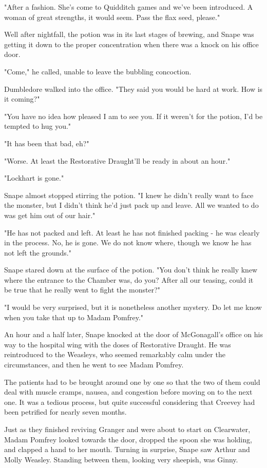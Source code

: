 \documentclass[a4paper,11pt]{article}
\begin{document}
"After a fashion. She's come to Quidditch games and we've been introduced. A woman of great strengths, it would seem. Pass the flax seed, please."

Well after nightfall, the potion was in its last stages of brewing, and Snape was getting it down to the proper concentration when there was a knock on his office door.

"Come," he called, unable to leave the bubbling concoction.

Dumbledore walked into the office. "They said you would be hard at work. How is it coming?"

"You have no idea how pleased I am to see you. If it weren't for the potion, I'd be tempted to hug you."

"It has been that bad, eh?"

"Worse. At least the Restorative Draught'll be ready in about an hour."

"Lockhart is gone."

Snape almost stopped stirring the potion. "I knew he didn't really want to face the monster, but I didn't think he'd just pack up and leave. All we wanted to do was get him out of our hair."

"He has not packed and left. At least he has not finished packing - he was clearly in the process. No, he is gone. We do not know where, though we know he has not left the grounds."

Snape stared down at the surface of the potion. "You don't think he really knew where the entrance to the Chamber was, do you? After all our teasing, could it be true that he really went to fight the monster?"

"I would be very surprised, but it is nonetheless another mystery. Do let me know when you take that up to Madam Pomfrey."

An hour and a half later, Snape knocked at the door of McGonagall's office on his way to the hospital wing with the doses of Restorative Draught. He was reintroduced to the Weasleys, who seemed remarkably calm under the circumstances, and then he went to see Madam Pomfrey.

The patients had to be brought around one by one so that the two of them could deal with muscle cramps, nausea, and congestion before moving on to the next one. It was a tedious process, but quite successful considering that Creevey had been petrified for nearly seven months.

Just as they finished reviving Granger and were about to start on Clearwater, Madam Pomfrey looked towards the door, dropped the spoon she was holding, and clapped a hand to her mouth. Turning in surprise, Snape saw Arthur and Molly Weasley. Standing between them, looking very sheepish, was Ginny.
\end{document}
